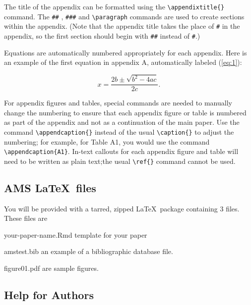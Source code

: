 \documentclass[draft]{ametsoc}
\begin{document}
The title of the appendix can be formatted using the
\texttt{\textbackslash{}appendixtitle\{\}} command. The \texttt{\#\#} ,
\texttt{\#\#\#} and \texttt{\textbackslash{}paragraph} commands are used
to create sections within the appendix. (Note that the appendix title
takes the place of \texttt{\#} in the appendix, so the first section
should begin with \texttt{\#\#} instead of \texttt{\#}.)

Equations are automatically numbered appropriately for each appendix.
Here is an example of the first equation in appendix A, automatically
labeled (\ref{eq:1}):

\begin{equation}
\label{eq:1}
x=\frac{2b\pm\sqrt{b^{2}-4ac}}{2c}.  
\end{equation}

For appendix figures and tables, special commands are needed to manually
change the numbering to ensure that each appendix figure or table is
numbered as part of the appendix and not as a continuation of the main
paper. Use the command \texttt{\textbackslash{}appendcaption\{\}}
instead of the usual \texttt{\textbackslash{}caption\{\}} to adjust the
numbering; for example, for Table A1, you would use the command
\texttt{\textbackslash{}appendcaption\{A1\}}. In-text callouts for each
appendix figure and table will need to be written as plain text;the
usual \texttt{\textbackslash{}ref\{\}} command cannot be used.

\appendix[B]

\hypertarget{ams-files}{%
\subsection{\texorpdfstring{AMS
\LaTeX~files}{AMS ~files}}\label{ams-files}}

You will be provided with a tarred, zipped \LaTeX~package containing 3
files. These files are

\begin{description}

\item
  your-paper-name.Rmd template for your paper
\item
  amstest.bib an example of a bibliographic database file.
\item
  figure01.pdf are sample figures.

\end{description}

\hypertarget{help-for-authors}{%
\subsection{Help for Authors}\label{help-for-authors}}
\end{document}

